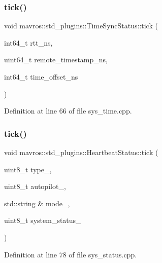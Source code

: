 \mbox{\label{group__plugin_gafa1a86312af75fd2ad8338575a104b5f}} 
\subsubsection{\texorpdfstring{tick()}{tick()}\hspace{0.1cm}{\footnotesize\ttfamily [1/2]}}
{\footnotesize\ttfamily void mavros\+::std\+\_\+plugins\+::\+Time\+Sync\+Status\+::tick (\begin{DoxyParamCaption}\item[{int64\+\_\+t}]{rtt\+\_\+ns,  }\item[{uint64\+\_\+t}]{remote\+\_\+timestamp\+\_\+ns,  }\item[{int64\+\_\+t}]{time\+\_\+offset\+\_\+ns }\end{DoxyParamCaption})\hspace{0.3cm}{\ttfamily [inline]}}



Definition at line 66 of file sys\+\_\+time.\+cpp.

\mbox{\label{group__plugin_ga3b9373356e08654bd08a28325ed4f24a}} 
\subsubsection{\texorpdfstring{tick()}{tick()}\hspace{0.1cm}{\footnotesize\ttfamily [2/2]}}
{\footnotesize\ttfamily void mavros\+::std\+\_\+plugins\+::\+Heartbeat\+Status\+::tick (\begin{DoxyParamCaption}\item[{uint8\+\_\+t}]{type\+\_\+,  }\item[{uint8\+\_\+t}]{autopilot\+\_\+,  }\item[{std\+::string \&}]{mode\+\_\+,  }\item[{uint8\+\_\+t}]{system\+\_\+status\+\_\+ }\end{DoxyParamCaption})\hspace{0.3cm}{\ttfamily [inline]}}



Definition at line 78 of file sys\+\_\+status.\+cpp.

\mbox{\label{group__plugin_ga94f263b4d2d2ef123678bd7bbbc6b5cf}} 
